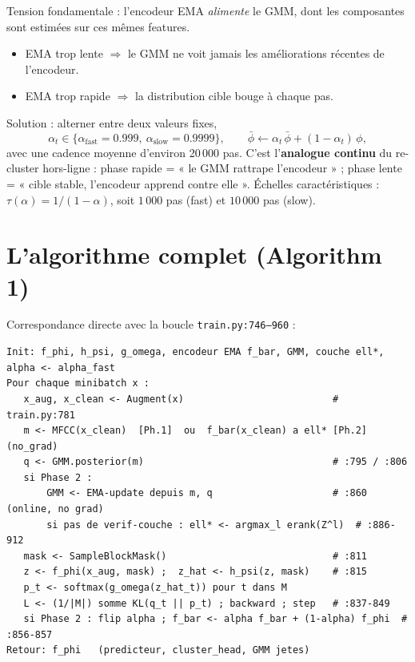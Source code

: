\documentclass[11pt,a4paper]{article}
\newcommand{\file}[1]{\texttt{#1}}
\begin{document}
Tension fondamentale : l'encodeur EMA \emph{alimente} le GMM, dont les
composantes sont estimées sur ces mêmes features.
\begin{itemize}[leftmargin=*]
  \item EMA trop lente $\Rightarrow$ le GMM ne voit jamais les améliorations
  récentes de l'encodeur.
  \item EMA trop rapide $\Rightarrow$ la distribution cible bouge à chaque pas.
\end{itemize}
Solution : alterner entre deux valeurs fixes,
\begin{equation}
\alpha_t \in \{\alpha_{\text{fast}}=0.999,\ \alpha_{\text{slow}}=0.9999\},
\qquad \bar\phi \leftarrow \alpha_t\,\bar\phi + (1-\alpha_t)\,\phi,
\end{equation}
avec une cadence moyenne d'environ 20\,000 pas. C'est l'\textbf{analogue
continu} du re-cluster hors-ligne : phase rapide = « le GMM rattrape
l'encodeur » ; phase lente = « cible stable, l'encodeur apprend contre
elle ». Échelles caractéristiques : $\tau(\alpha)=1/(1-\alpha)$, soit
$1\,000$ pas (fast) et $10\,000$ pas (slow).

\section{L'algorithme complet (Algorithm 1)}

Correspondance directe avec la boucle \file{train.py:746--960} :

\begin{lstlisting}
Init: f_phi, h_psi, g_omega, encodeur EMA f_bar, GMM, couche ell*, alpha <- alpha_fast
Pour chaque minibatch x :
   x_aug, x_clean <- Augment(x)                          # train.py:781
   m <- MFCC(x_clean)  [Ph.1]  ou  f_bar(x_clean) a ell* [Ph.2]   (no_grad)
   q <- GMM.posterior(m)                                 # :795 / :806
   si Phase 2 :
       GMM <- EMA-update depuis m, q                     # :860 (online, no grad)
       si pas de verif-couche : ell* <- argmax_l erank(Z^l)  # :886-912
   mask <- SampleBlockMask()                             # :811
   z <- f_phi(x_aug, mask) ;  z_hat <- h_psi(z, mask)    # :815
   p_t <- softmax(g_omega(z_hat_t)) pour t dans M
   L <- (1/|M|) somme KL(q_t || p_t) ; backward ; step   # :837-849
   si Phase 2 : flip alpha ; f_bar <- alpha f_bar + (1-alpha) f_phi  # :856-857
Retour: f_phi   (predicteur, cluster_head, GMM jetes)
\end{lstlisting}
\end{document}

